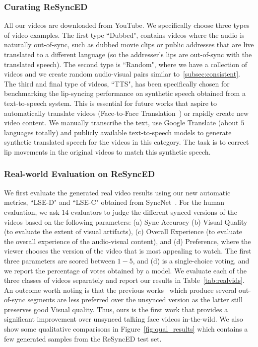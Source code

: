 \documentclass[sigconf]{acmart}
\begin{document}
\subsubsection{Curating ReSyncED} All our videos are downloaded from YouTube. We specifically choose three types of video examples. The first type ``Dubbed", contains videos where the audio is naturally out-of-sync, such as dubbed movie clips or public addresses that are live translated to a different language (so the addresser's lips are out-of-sync with the translated speech). The second type is ``Random", where we have a collection of videos and we create random audio-visual pairs similar to~\ref{subsec:consistent}. The third and final type of videos, ``TTS", has been specifically chosen for benchmarking the lip-syncing performance on synthetic speech obtained from a text-to-speech system. This is essential for future works that aspire to automatically translate videos (Face-to-Face Translation~\cite{kr2019towards}) or rapidly create new video content. We manually transcribe the text, use Google Translate (about $5$ languages totally) and publicly available text-to-speech models to generate synthetic translated speech for the videos in this category. The task is to correct lip movements in the original videos to match this synthetic speech.

\subsubsection{Real-world Evaluation on ReSyncED}
We first evaluate the generated real video results using our new automatic metrics, ``LSE-D" and ``LSE-C" obtained from SyncNet~\cite{Chung16a}. For the human evaluation, we ask $14$ evaluators to judge the different synced versions of the videos based on the following parameters: (a) Sync Accuracy (b) Visual Quality (to evaluate the extent of visual artifacts), (c) Overall Experience (to evaluate the  overall experience of the audio-visual content), and (d) Preference, where the viewer chooses the version of the video that is most appealing to watch. The first three parameters are scored between $1 - 5$, and (d) is a single-choice voting, and we report the percentage of votes obtained by a model. We evaluate each of the three classes of videos separately and report our results in Table~\ref{tab:realvids}. An outcome worth noting is that the previous works~\cite{kr2019towards,jamaludin2019you} which produce several out-of-sync segments are less preferred over the unsynced version as the latter still preserves good Visual quality. Thus, ours is the first work that provides a significant improvement over unsynced talking face videos in-the-wild. We also show some qualitative comparisons in Figure~\ref{fig:qual_results} which contains a few generated samples from the ReSyncED test set.
\end{document}
